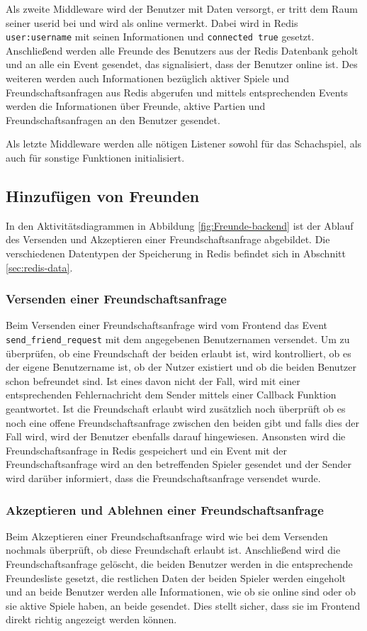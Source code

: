 Als zweite Middleware wird der Benutzer mit Daten versorgt, er tritt dem Raum seiner userid bei und wird als online vermerkt. Dabei wird in Redis \verb|user:username| mit seinen Informationen und \verb|connected true| gesetzt. Anschließend werden alle Freunde des Benutzers aus der Redis Datenbank geholt und an alle ein Event gesendet, das signalisiert, dass der Benutzer online ist. Des weiteren werden auch Informationen bezüglich aktiver Spiele und Freundschaftsanfragen aus Redis abgerufen und mittels entsprechenden Events werden die Informationen über Freunde, aktive Partien und Freundschaftsanfragen an den Benutzer gesendet.

Als letzte Middleware werden alle nötigen Listener sowohl für das Schachspiel, als auch für sonstige Funktionen initialisiert.

\subsection{Hinzufügen von Freunden}
In den Aktivitätsdiagrammen in Abbildung \ref{fig:Freunde-backend} ist der Ablauf des Versenden und Akzeptieren einer Freundschaftsanfrage abgebildet.
Die verschiedenen Datentypen der Speicherung in Redis befindet sich in Abschnitt \ref{sec:redis-data}.

\subsubsection{Versenden einer Freundschaftsanfrage}
Beim Versenden einer Freundschaftsanfrage wird vom Frontend das Event \verb|send_friend_request| mit dem angegebenen Benutzernamen versendet. Um zu überprüfen, ob eine Freundschaft der beiden erlaubt ist, wird kontrolliert, ob es der eigene Benutzername ist, ob der Nutzer existiert und ob die beiden Benutzer schon befreundet sind. Ist eines davon nicht der Fall, wird mit einer entsprechenden Fehlernachricht dem Sender mittels einer Callback Funktion geantwortet. 
Ist die Freundschaft erlaubt wird zusätzlich noch überprüft ob es noch eine offene Freundschaftsanfrage zwischen den beiden gibt und falls dies der Fall wird, wird der Benutzer ebenfalls darauf hingewiesen.
Ansonsten wird die Freundschaftsanfrage in Redis gespeichert und ein Event mit der Freundschaftsanfrage wird an den betreffenden Spieler gesendet und der Sender wird darüber informiert, dass die Freundschaftsanfrage versendet wurde.

\subsubsection{Akzeptieren und Ablehnen einer Freundschaftsanfrage}
\label{sec:accept-friend-request}
Beim Akzeptieren einer Freundschaftsanfrage wird wie bei dem Versenden nochmals überprüft, ob diese Freundschaft erlaubt ist. Anschließend wird die Freundschaftsanfrage gelöscht, die beiden Benutzer werden in die entsprechende Freundesliste gesetzt, die restlichen Daten der beiden Spieler werden eingeholt und an beide Benutzer werden alle Informationen, wie ob sie online sind oder ob sie aktive Spiele haben, an beide gesendet. Dies stellt sicher, dass sie im Frontend direkt richtig angezeigt werden können.

